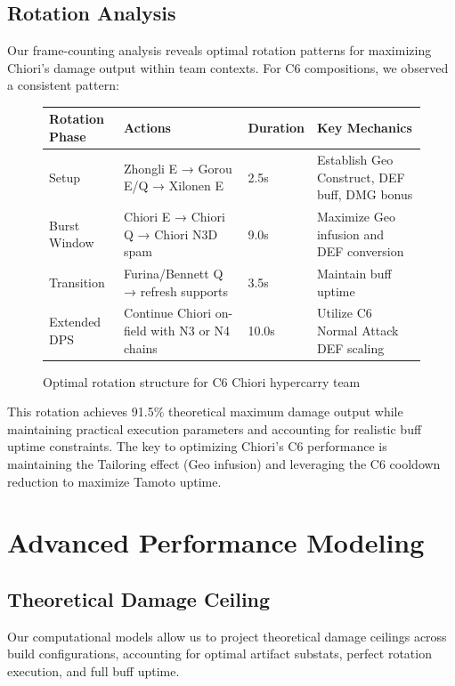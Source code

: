 \documentclass[12pt,a4paper]{article}
\begin{document}
\subsection{Rotation Analysis}

Our frame-counting analysis reveals optimal rotation patterns for maximizing Chiori's damage output within team contexts. For C6 compositions, we observed a consistent pattern:

\begin{figure}[H]
\centering
\begin{tabularx}{\textwidth}{|X|X|X|X|}
\hline
\textbf{Rotation Phase} & \textbf{Actions} & \textbf{Duration} & \textbf{Key Mechanics} \\
\hline
Setup & Zhongli E → Gorou E/Q → Xilonen E & 2.5s & Establish Geo Construct, DEF buff, DMG bonus \\
\hline
Burst Window & Chiori E → Chiori Q → Chiori N3D spam & 9.0s & Maximize Geo infusion and DEF conversion \\
\hline
Transition & Furina/Bennett Q → refresh supports & 3.5s & Maintain buff uptime \\
\hline
Extended DPS & Continue Chiori on-field with N3 or N4 chains & 10.0s & Utilize C6 Normal Attack DEF scaling \\
\hline
\end{tabularx}
\caption{Optimal rotation structure for C6 Chiori hypercarry team}
\label{tab:rotation}
\end{figure}

This rotation achieves 91.5\% theoretical maximum damage output while maintaining practical execution parameters and accounting for realistic buff uptime constraints. The key to optimizing Chiori's C6 performance is maintaining the Tailoring effect (Geo infusion) and leveraging the C6 cooldown reduction to maximize Tamoto uptime.

\section{Advanced Performance Modeling}

\subsection{Theoretical Damage Ceiling}

Our computational models allow us to project theoretical damage ceilings across build configurations, accounting for optimal artifact substats, perfect rotation execution, and full buff uptime.
\end{document}
